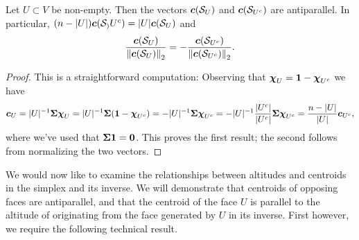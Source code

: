 \begin{lemma}
\label{lem:complimentary_centroids}
Let $U\subset V$ be non-empty. Then the vectors $\vb*{c}(\mathcal{S}_U)$ and $\vb*{c}(\mathcal{S}_{U^c})$ are antiparallel. In particular, $(n-|U|)\vb*{c}(\mathcal{S}_){U^c}) = |U|\vb*{c}(\mathcal{S}_{U})$ and 
\[\frac{\vb*{c}(\mathcal{S}_U)}{\norm{\vb*{c}(\mathcal{S}_U)}_2}=-\frac{\vb*{c}(\mathcal{S}_{U^c})}{\norm{\vb*{c}(\mathcal{S}_{U^c})}_2}.\]
\end{lemma}
\begin{proof}
This is a straightforward computation: Observing that $\boldsymbol{\chi}_U=\vb{1}-\boldsymbol{\chi}_{U^c}$ we have  
\[\vb*{c}_U = |U|^{-1}\boldsymbol{\Sigma}\boldsymbol{\chi}_U = |U|^{-1}\boldsymbol{\Sigma}(\vb{1}-\boldsymbol{\chi}_{U^c})=-|U|^{-1}\boldsymbol{\Sigma}\boldsymbol{\chi}_{U^c}=-|U|^{-1}\frac{|U^c|}{|U^c|}\boldsymbol{\Sigma}\boldsymbol{\chi}_{U^c}=\frac{n-|U|}{|U|}\vb*{c}_{U^c},\]
where we've used that $\boldsymbol{\Sigma}\vb{1}=\vb{0}$. This proves the first result; the second follows from normalizing the two vectors.
\end{proof}

We would now like to examine the relationships between altitudes and centroids in the simplex and its inverse. We will demonstrate that centroids of opposing faces are antiparallel, and that the centroid of the face $U$ is parallel to the altitude of originating from the face generated by $U$ in its inverse. First however, we require the following technical result. 

